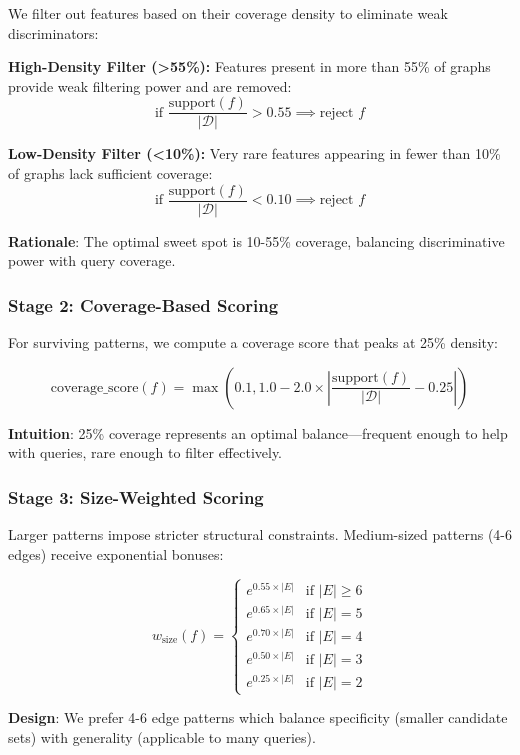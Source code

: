 \documentclass[12pt,a4paper]{article}
\begin{document}
We filter out features based on their coverage density to eliminate weak discriminators:

\textbf{High-Density Filter (>55\%):} Features present in more than 55\% of graphs provide weak filtering power and are removed:
\[
\text{if } \frac{\text{support}(f)}{|\mathcal{D}|} > 0.55 \implies \text{reject } f
\]

\textbf{Low-Density Filter (<10\%):} Very rare features appearing in fewer than 10\% of graphs lack sufficient coverage:
\[
\text{if } \frac{\text{support}(f)}{|\mathcal{D}|} < 0.10 \implies \text{reject } f
\]

\textbf{Rationale}: The optimal sweet spot is 10-55\% coverage, balancing discriminative power with query coverage.

\subsubsection{Stage 2: Coverage-Based Scoring}

For surviving patterns, we compute a coverage score that peaks at 25\% density:

\[
\text{coverage\_score}(f) = \max\left(0.1, 1.0 - 2.0 \times \left|\frac{\text{support}(f)}{|\mathcal{D}|} - 0.25\right|\right)
\]

\textbf{Intuition}: 25\% coverage represents an optimal balance—frequent enough to help with queries, rare enough to filter effectively.

\subsubsection{Stage 3: Size-Weighted Scoring}

Larger patterns impose stricter structural constraints. Medium-sized patterns (4-6 edges) receive exponential bonuses:

\[
w_{\text{size}}(f) = 
\begin{cases}
e^{0.55 \times |E|} & \text{if } |E| \geq 6 \\
e^{0.65 \times |E|} & \text{if } |E| = 5 \\
e^{0.70 \times |E|} & \text{if } |E| = 4 \\
e^{0.50 \times |E|} & \text{if } |E| = 3 \\
e^{0.25 \times |E|} & \text{if } |E| = 2
\end{cases}
\]

\textbf{Design}: We prefer 4-6 edge patterns which balance specificity (smaller candidate sets) with generality (applicable to many queries).
\end{document}
